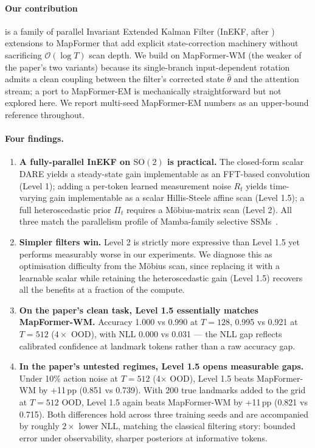 \paragraph{Our contribution} is a family of parallel Invariant Extended
Kalman Filter (InEKF, after \citealp{barrau2017inekf}) extensions to
MapFormer that add explicit state-correction machinery without sacrificing
$\mathcal{O}(\log T)$ scan depth. We build on MapFormer-WM (the weaker of the
paper's two variants) because its single-branch input-dependent rotation
admits a clean coupling between the filter's corrected state $\hat\theta$ and
the attention stream; a port to MapFormer-EM is mechanically straightforward
but not explored here. We report multi-seed MapFormer-EM numbers as an
upper-bound reference throughout.

\paragraph{Four findings.}

\begin{enumerate}
  \item \textbf{A fully-parallel InEKF on $\mathrm{SO}(2)$ is practical.} The
  closed-form scalar DARE yields a steady-state gain implementable as an
  FFT-based convolution (Level 1); adding a per-token learned measurement
  noise $R_t$ yields time-varying gain implementable as a scalar
  Hillis-Steele affine scan (Level 1.5); a full heteroscedastic prior
  $\Pi_t$ requires a M\"obius-matrix scan (Level 2). All three match the
  parallelism profile of Mamba-family selective SSMs~\citep{gu2024mamba}.
  \item \textbf{Simpler filters win.} Level 2 is strictly more expressive
  than Level 1.5 yet performs measurably worse in our experiments. We
  diagnose this as optimisation difficulty from the M\"obius scan, since
  replacing it with a learnable scalar while retaining the heteroscedastic
  gain (Level 1.5) recovers all the benefits at a fraction of the compute.
  \item \textbf{On the paper's clean task, Level 1.5 essentially matches
  MapFormer-WM.} Accuracy 1.000 vs 0.990 at $T{=}128$, 0.995 vs 0.921 at
  $T{=}512$ ($4\times$ OOD), with NLL 0.000 vs 0.031 --- the NLL gap reflects
  calibrated confidence at landmark tokens rather than a raw accuracy gap.
  \item \textbf{In the paper's untested regimes, Level 1.5 opens measurable
  gaps.} Under 10\% action noise at $T{=}512$ (4$\times$ OOD), Level 1.5
  beats MapFormer-WM by +11\,pp (0.851 vs 0.739). With 200 true landmarks
  added to the grid at $T{=}512$ OOD, Level 1.5 again beats MapFormer-WM by
  +11\,pp (0.821 vs 0.715). Both differences hold across three training
  seeds and are accompanied by roughly $2\times$ lower NLL, matching the
  classical filtering story: bounded error under observability, sharper
  posteriors at informative tokens.
\end{enumerate}

